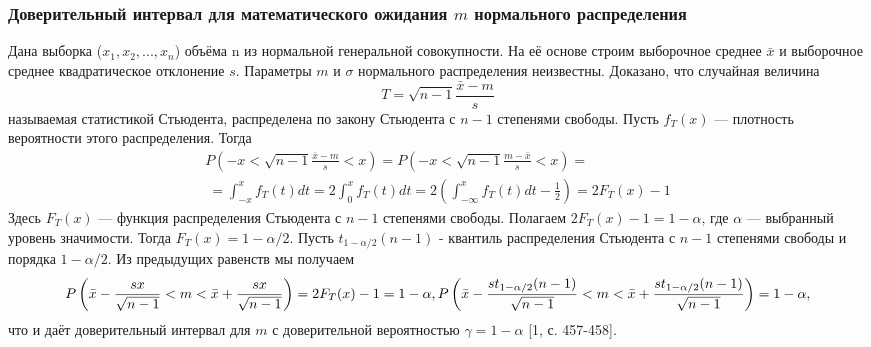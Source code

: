 \documentclass[12pt,a4paper]{scrartcl}
\begin{document}
	\subsubsection{Доверительный интервал для математического ожидания $m$ нормального распределения}
	Дана выборка ($x_{1},x_{2}, ... ,x_{n}$) объёма n из нормальной генеральной совокупности. На её основе строим выборочное среднее $\bar{x}$ и выборочное среднее квадратическое отклонение $s$. Параметры $m$ и $\sigma$ нормального распределения неизвестны.
	\newline
    Доказано, что случайная величина
    \begin{equation}
        T = \sqrt{n - 1}\frac{\bar{x} - m}{s}
        \label{T}
    \end{equation}
    называемая статистикой Стьюдента, распределена по закону Стьюдента с $n-1$ степенями свободы. Пусть $f_{T}(x)$ — плотность вероятности этого распределения. Тогда 
    \begin{multline}
        P\left(-x < \sqrt{n - 1}\frac{\bar{x} - m}{s} < x \right) = 
        P\left(-x < \sqrt{n - 1}\frac{m - \bar{x}}{s} < x \right) = \\\
        = \int_{-x}^{x}{f_{T}(t)dt} = 2 \int_{0}^{x}{f_{T}(t)dt} = 
        2\left(  \int_{-\infty}^{x}{f_{T}(t)dt} - \frac{1}{2} \right) = 2F_{T}(x) - 1
        \label{P_f_t}
    \end{multline}
    Здесь $F_{T}(x)$ — функция распределения Стьюдента с $n-1$ степенями свободы.
    \newline
    Полагаем $2F_{T}(x)-1 = 1-\alpha$, где $\alpha$ — выбранный уровень значимости. Тогда $F_{T}(x) = 1-\alpha/2$. Пусть $t_{1-\alpha/2}(n-1)$ - квантиль распределения Стьюдента с $n-1$ степенями свободы и порядка $1-\alpha/2$. Из предыдущих равенств мы получаем 
    \begin{equation}
             P\left(\bar{x} - \frac{sx}{\sqrt{n-1}} < m <  \bar{x} + \frac{sx}{\sqrt{n-1}}\right) = 2F_{T}(x) - 1 = 1 - \alpha,  \\
             P\left(\bar{x} - \frac{st_{1-\alpha/2}(n-1)}{\sqrt{n-1}} < m <  \bar{x} + \frac{st_{1-\alpha/2}(n-1)}{\sqrt{n-1}}\right)= 1 - \alpha,
        \label{P_m}         
    \end{equation}
    что и даёт доверительный интервал для $m$ с доверительной вероятностью $\gamma = 1-\alpha$ [1, с. 457-458].
    
\end{document}
